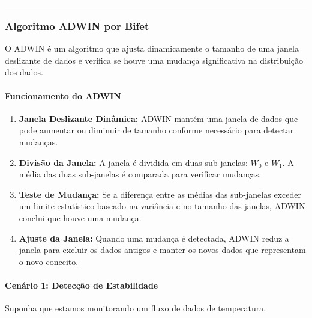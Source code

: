\documentclass[
]{article}
\begin{document}
\begin{center}\rule{0.5\linewidth}{0.5pt}\end{center}

\hypertarget{algoritmo-adwin-por-bifet}{%
\subsubsection{Algoritmo ADWIN por
Bifet}\label{algoritmo-adwin-por-bifet}}

O ADWIN é um algoritmo que ajusta dinamicamente o tamanho de uma janela
deslizante de dados e verifica se houve uma mudança significativa na
distribuição dos dados.

\hypertarget{funcionamento-do-adwin}{%
\paragraph{Funcionamento do ADWIN}\label{funcionamento-do-adwin}}

\begin{enumerate}
\def\labelenumi{\arabic{enumi}.}
\item
  \textbf{Janela Deslizante Dinâmica:} ADWIN mantém uma janela de dados
  que pode aumentar ou diminuir de tamanho conforme necessário para
  detectar mudanças.
\item
  \textbf{Divisão da Janela:} A janela é dividida em duas sub-janelas:
  \(W_0\) e \(W_1\). A média das duas sub-janelas é comparada para
  verificar mudanças.
\item
  \textbf{Teste de Mudança:} Se a diferença entre as médias das
  sub-janelas exceder um limite estatístico baseado na variância e no
  tamanho das janelas, ADWIN conclui que houve uma mudança.
\item
  \textbf{Ajuste da Janela:} Quando uma mudança é detectada, ADWIN reduz
  a janela para excluir os dados antigos e manter os novos dados que
  representam o novo conceito.
\end{enumerate}

\hypertarget{cenuxe1rio-1-detecuxe7uxe3o-de-estabilidade}{%
\paragraph{Cenário 1: Detecção de
Estabilidade}\label{cenuxe1rio-1-detecuxe7uxe3o-de-estabilidade}}

Suponha que estamos monitorando um fluxo de dados de temperatura.
\end{document}
